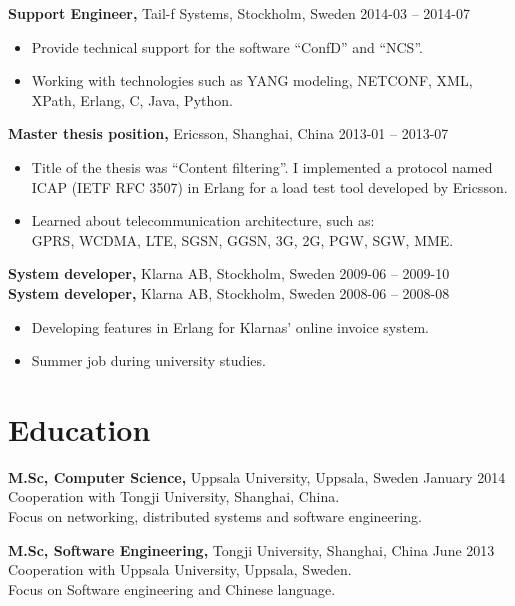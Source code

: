 \documentclass[margin]{res}
\begin{document}
\begin{resume}
{\bf Support Engineer,} Tail-f Systems, Stockholm, Sweden \hfill 2014-03 -- 2014-07
 \begin{itemize} \itemsep -2pt  %
 \item Provide technical support for the software ``ConfD'' and ``NCS''.
 \item Working with technologies such as YANG modeling, NETCONF,
   XML, XPath, Erlang, C, Java, Python.
 \end{itemize}

{\bf Master thesis position,} Ericsson, Shanghai, China \hfill 2013-01 -- 2013-07
 \begin{itemize} \itemsep -2pt  %
 \item Title of the thesis was ``Content filtering''. I implemented a protocol named
   ICAP (IETF RFC 3507) in Erlang for a load test tool
   developed by Ericsson.
 \item Learned about telecommunication architecture, such as: \\
 GPRS, WCDMA, LTE, SGSN, GGSN, 3G, 2G, PGW, SGW, MME.
 \end{itemize}

{\bf System developer,} Klarna AB, Stockholm, Sweden \hfill 2009-06 -- 2009-10\\
{\bf System developer,} Klarna AB, Stockholm, Sweden \hfill 2008-06 -- 2008-08
 \begin{itemize} \itemsep -2pt  %
 \item Developing features in Erlang for Klarnas' online invoice system.
 \item Summer job during university studies.
 \end{itemize}

\section{Education}
{\bf M.Sc,  Computer Science,} Uppsala University, Uppsala, Sweden \hfill January 2014 \\
Cooperation with Tongji University, Shanghai, China. \\
Focus on networking, distributed systems and software engineering.

{\bf M.Sc, Software Engineering,} Tongji University, Shanghai, China \hfill June 2013 \\
Cooperation with Uppsala University, Uppsala, Sweden.\\
Focus on Software engineering and Chinese language.


\end{resume}
\end{document}
